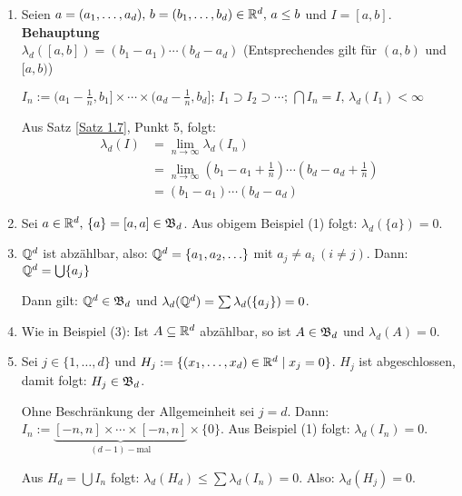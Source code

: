 \documentclass[a4paper,twoside,DIV15,BCOR12mm,chapterprefix=true,headings=onelinechapter]{scrbook}
\begin{document}
\begin{beispieleX}
\begin{enumerate}
\item Seien \(a=(a_{1},\ldots,a_{d}),\,b=(b_{1},\ldots,b_{d})\in\mathbb{R}^{d},\,a\leq b\) und \(I=[a,b]\).\\
\textbf{Behauptung}\\\(\lambda_{d}([a,b])=(b_{1}-a_{1})\cdots(b_{d}-a_{d})\) (Entsprechendes gilt f\"ur \((a,b)\) und \([a,b)\))
\begin{beweis}
\(I_{n}:=(a_{1}-\frac{1}{n},b_{1}]\times\cdots\times(a_{d}-\frac{1}{n},b_{d}];\,I_{1}\supset I_{2}\supset\cdots;\,\bigcap I_{n}=I,\,\lambda_{d}(I_{1})<\infty\)

Aus Satz \ref{Satz 1.7}, Punkt 5, folgt:
\begin{align*}
\lambda_{d}(I)&=\lim_{n\to\infty}{\lambda_{d}(I_{n})}\\
&=\lim_{n\to\infty}{(b_{1}-a_{1}+\frac{1}{n})\cdots(b_{d}-a_{d}+\frac{1}{n})}\\
&=(b_{1}-a_{1})\cdots(b_{d}-a_{d})
\end{align*}
\end{beweis}
\item Sei \(a\in\mathbb{R}^{d},\,\{a\}=[a,a]\in\mathfrak{B}_{d}\). Aus obigem Beispiel (1)
folgt: \(\lambda_{d}(\{a\})=0\).
\item \(\mathbb{Q}^{d}\) ist abz\"ahlbar, also: \(\mathbb{Q}^{d}=\{a_{1},a_{2},\ldots\}\)
mit \(a_{j}\neq a_{i}\,(i\neq j)\). Dann: \(\mathbb{Q}^{d}=\bigcup\{a_{j}\}\) %

Dann gilt: \(\mathbb{Q}^{d}\in\mathfrak{B}_{d}\) und \(\lambda_{d}(\mathbb{Q}^{d})=\sum{\lambda_{d}(\{a_{j}\})}=0\).
\item Wie in Beispiel (3): Ist \(A\subseteq\mathbb{R}^{d}\) abz\"ahlbar, so ist
\(A\in\mathfrak{B}_{d}\) und \(\lambda_{d}(A)=0\).
\item Sei \(j\in\{1,\ldots,d\}\) und \(H_{j}:=\{(x_{1},\ldots,x_{d})\in\mathbb{R}^{d}\mid x_{j}=0\}\). \(H_{j}\) ist abgeschlossen, damit folgt: \(H_{j}\in\mathfrak{B}_{d}\).

Ohne Beschr\"ankung der Allgemeinheit sei \(j=d\). Dann:
\(I_{n}:=\underbrace{[-n,n]\times\cdots\times[-n,n]}_{(d-1)-\text{mal}}\times\{0\}\).
Aus Beispiel (1) folgt: \(\lambda_{d}(I_{n})=0\).

Aus \(H_{d}=\bigcup{I_{n}}\) folgt: \(\lambda_{d}(H_{d})\leq\sum{\lambda_{d}(I_{n})}=0\). Also: \(\lambda_{d}(H_{j})=0\).
\end{enumerate}
\end{beispieleX}
\end{document}
